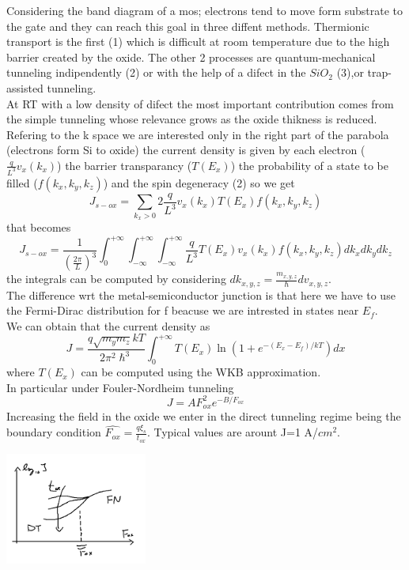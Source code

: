 Considering the band diagram of a mos; electrons tend to move form substrate to the gate and they can reach this goal in three diffent methods. Thermionic transport is the first (1) which is difficult at room temperature due to the high barrier created by the oxide. The other 2 processes are quantum-mechanical tunneling indipendently (2) or with the help of a difect in the $SiO_2$ (3),or trap-assisted tunneling.\\
At RT with a low density of difect the most important contribution comes from the simple tunneling whose relevance grows as the oxide thikness is reduced.\\
Refering to the k space we are interested only in the right part of the parabola (electrons form Si to oxide) the current density is given by each electron ($\frac{q}{L^3}v_x(k_x)$) the barrier transparancy ($T(E_x)$) the probability of a state to be filled ($f(k_x,k_y,k_z)$) and the spin degeneracy (2) so we get 
\begin{equation}
J_{s-ox}=\sum_{k_x>0}2 \frac{q}{L^3}v_x(k_x)T(E_x)f(k_x,k_y,k_z)
\end{equation}
that becomes 
\begin{equation}
J_{s-ox}=\frac{1}{(\frac{2\pi}{L})^3}\int_{0}^{+\infty}\int_{-\infty}^{+\infty}\int_{-\infty}^{+\infty}\frac{q}{L^3}T(E_x)v_x(k_x)f(k_x,k_y,k_z)dk_xdk_ydk_z
\end{equation}
the integrals can be computed by considering $dk_{x,y,z}=\frac{m_{x,y,z}}{\hslash}dv_{x,y,z}$.\\
The difference wrt the metal-semiconductor junction is that here we have to use the Fermi-Dirac distribution for f beacuse we are intrested in states near $E_f$.\\
We can obtain that the current density as 
\begin{equation}
J=\frac{q\sqrt{m_ym_z}kT}{2\pi^2\hslash^3}\int^{+\infty}_0T(E_x)\ln(1+e^{-(E_x-E_f)/kT})dx
\end{equation}
where $T(E_x)$ can be computed using the WKB approximation.\\
In particular under Fouler-Nordheim tunneling 
\begin{equation}
J=AF_{ox}^2e^{-B/F_{ox}}
\end{equation}
Increasing the field in the oxide we enter in the direct tunneling regime being the boundary condition $\hat{F_{ox}}=\frac{q\xi_s}{t_{ox}}$. Typical values are arount J=1 A/$cm^2$.


\centering
\includegraphics[width=0.35\textwidth]{fndt.png}\\
\raggedright


